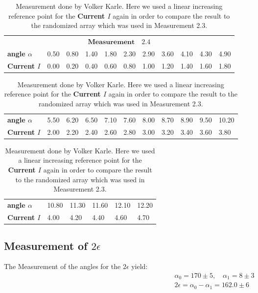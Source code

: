     \begin{table}[htdp]
        \begin{tabular}{|l||p{1.1cm}|p{1.1cm}|p{1.1cm}|p{1.1cm}|p{1.1cm}|p{1.1cm}|p{1.1cm}|p{1.1cm}|p{1.1cm}|p{1.1cm}|}
        \hline
            \multicolumn{11}{|c|}{\cellcolor[RGB]{206,250,201}$
            \mathbf{Measurement \quad 2.4}$} \\
\textbf{angle $\alpha$}& 0.50& 0.80& 1.40& 1.80& 2.30& 2.90& 3.60& 4.10& 4.30& 4.90 \\
\textbf{Current $I$}& 0.00& 0.20& 0.40& 0.60& 0.80& 1.00& 1.20& 1.40& 1.60& 1.80 \\

        \hline
        \end{tabular}
        \begin{tabular}{|l||p{1.1cm}|p{1.1cm}|p{1.1cm}|p{1.1cm}|p{1.1cm}|p{1.1cm}|p{1.1cm}|p{1.1cm}|p{1.1cm}|p{1.1cm}|}
        \hline\textbf{angle $\alpha$}& 5.50& 6.20& 6.50& 7.10& 7.60& 8.00& 8.70& 8.90& 9.50& 10.20 \\
\textbf{Current $I$}& 2.00& 2.20& 2.40& 2.60& 2.80& 3.00& 3.20& 3.40& 3.60& 3.80 \\

        \hline
        \end{tabular}
    \begin{tabular}{|l||p{1.1cm}|p{1.1cm}|p{1.1cm}|p{1.1cm}|p{1.1cm}|}
    \hline\textbf{angle $\alpha$}& 10.80& 11.30& 11.60& 12.10& 12.20 \\
\textbf{Current $I$}& 4.00& 4.20& 4.40& 4.60& 4.70 \\

    \hline
    \end{tabular}
    \caption{Measurement done by Volker Karle. Here we used a linear increasing reference point
        for the \textbf{Current $I$} again in order to compare the result to the randomized
        array which was used in Measurement 2.3.}
    \label{Power05}
    \end{table}
\subsection{Measurement of $2\epsilon$}

\begin{center}
 The Measurement of the angles for the $2\epsilon$ yield:
\begin{align}
    \alpha_0 = 170 \pm 5, \quad
    \alpha_1 = 8   \pm 3 \\
    2\epsilon = \alpha_0 - \alpha_1 = 162.0 \pm 6   
\end{align}
\end{center}

